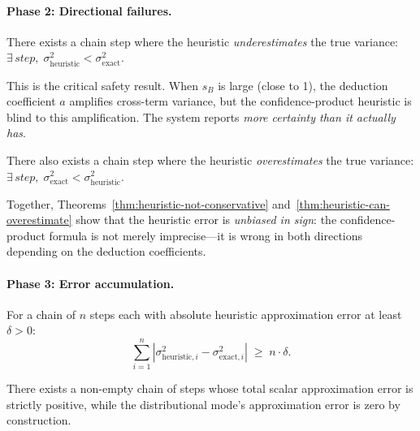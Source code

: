 \documentclass[11pt,openany]{report}
\begin{document}
\paragraph{Phase 2: Directional failures.}
\begin{theorem}
\label{thm:heuristic-not-conservative}
There exists a chain step where the heuristic \emph{underestimates} the true
variance:
$\exists\, \mathit{step},\; \sigma^2_{\mathrm{heuristic}} < \sigma^2_{\mathrm{exact}}$.
\end{theorem}

This is the critical safety result.  When $s_B$ is large (close to 1), the
deduction coefficient $a$ amplifies cross-term variance, but the
confidence-product heuristic is blind to this amplification.  The system
reports \emph{more certainty than it actually has}.

\begin{theorem}
\label{thm:heuristic-can-overestimate}
There also exists a chain step where the heuristic \emph{overestimates} the
true variance:
$\exists\, \mathit{step},\; \sigma^2_{\mathrm{exact}} < \sigma^2_{\mathrm{heuristic}}$.
\end{theorem}

Together, Theorems~\ref{thm:heuristic-not-conservative}
and~\ref{thm:heuristic-can-overestimate} show that the heuristic error is
\emph{unbiased in sign}: the confidence-product formula is not merely
imprecise---it is wrong in both directions depending on the deduction
coefficients.

\paragraph{Phase 3: Error accumulation.}
\begin{theorem}
\label{thm:scalar-error-accumulates}
For a chain of $n$ steps each with absolute heuristic approximation error
at least $\delta > 0$:
\[
  \sum_{i=1}^{n} |\sigma^2_{\mathrm{heuristic},i} - \sigma^2_{\mathrm{exact},i}|
  \;\ge\; n \cdot \delta.
\]
\end{theorem}

\begin{theorem}
\label{thm:distributional-dominates-scalar}
There exists a non-empty chain of steps whose total scalar approximation
error is strictly positive, while the distributional mode's approximation
error is zero by construction.
\end{theorem}
\end{document}
